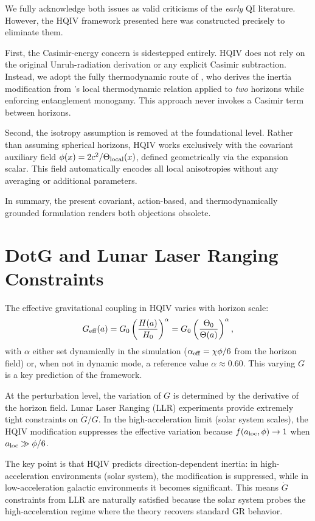 \documentclass[12pt,a4paper]{article}
\begin{document}
We fully acknowledge both issues as valid criticisms of the \emph{early} QI literature. However, the HQIV framework presented here was constructed precisely to eliminate them.

First, the Casimir-energy concern is sidestepped entirely. HQIV does not rely on the original Unruh-radiation derivation or any explicit Casimir subtraction. Instead, we adopt the fully thermodynamic route of \citet{brodie2026}, who derives the inertia modification from \citet{Jacobson1995}'s local thermodynamic relation applied to \emph{two} horizons while enforcing entanglement monogamy. This approach never invokes a Casimir term between horizons.

Second, the isotropy assumption is removed at the foundational level. Rather than assuming spherical horizons, HQIV works exclusively with the covariant auxiliary field $\phi(x) = 2c^2/\Theta_{\rm local}(x)$, defined geometrically via the expansion scalar. This field automatically encodes all local anisotropies without any averaging or additional parameters.

In summary, the present covariant, action-based, and thermodynamically grounded formulation renders both objections obsolete.

\section{DotG and Lunar Laser Ranging Constraints}

The effective gravitational coupling in HQIV varies with horizon scale:
\[
G_{\rm eff}(a) = G_0 \left(\frac{H(a)}{H_0}\right)^\alpha = G_0 \left(\frac{\Theta_0}{\Theta(a)}\right)^\alpha,
\]
with $\alpha$ either set dynamically in the simulation ($\alpha_{\rm eff} = \chi\phi/6$ from the horizon field) or, when not in dynamic mode, a reference value $\alpha \approx 0.60$. This varying $G$ is a key prediction of the framework.

At the perturbation level, the variation of $G$ is determined by the derivative of the horizon field. Lunar Laser Ranging (LLR) experiments provide extremely tight constraints on $\dot{G}/G$. In the high-acceleration limit (solar system scales), the HQIV modification suppresses the effective variation because $f(a_{\rm loc},\phi) \to 1$ when $a_{\rm loc} \gg \phi/6$.

The key point is that HQIV predicts direction-dependent inertia: in high-acceleration environments (solar system), the modification is suppressed, while in low-acceleration galactic environments it becomes significant. This means $\dot{G}$ constraints from LLR are naturally satisfied because the solar system probes the high-acceleration regime where the theory recovers standard GR behavior.
\end{document}
